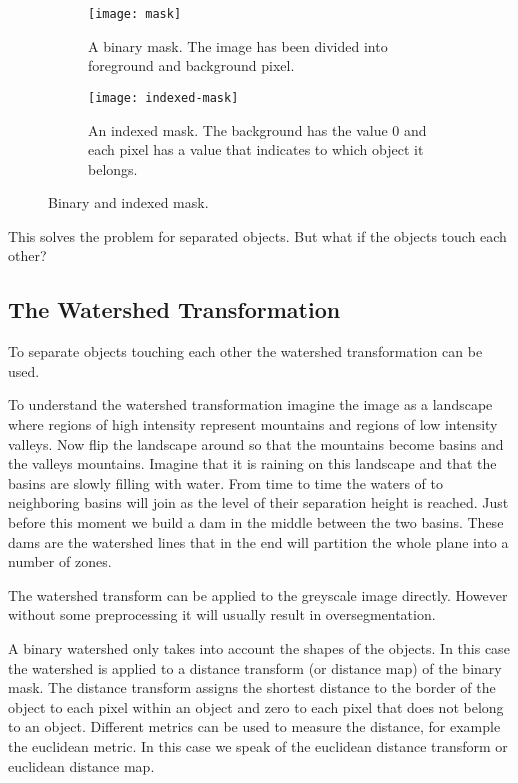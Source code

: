 \begin{figure}[h!]
  \centering
\begin{subfigure}[t]{0.30\textwidth}
\texttt{[image: mask]}
    \caption[binary mask]{A binary mask. The image has been divided into foreground and background pixel.}
    \label{binary-mask}
\end{subfigure}  
\begin{subfigure}[t]{0.30\textwidth}
\texttt{[image: indexed-mask]}
    \caption[indexed mask]{An indexed mask. The background has the value 0 and each pixel has a value that indicates to which object it belongs.}
    \label{indexed-mask}
\end{subfigure}
   \caption{Binary and indexed mask.}
   \label{binary-and-indexed-mask}
\end{figure}

This solves the problem for separated objects. But what if the objects touch each other? 

\subsection{The Watershed Transformation}

To separate objects touching each other the watershed transformation\cite{beucher_morphological_1992} can be used.

To understand the watershed transformation imagine the image as a landscape where regions of high intensity represent mountains and regions of low intensity valleys. Now flip the landscape around so that the mountains become basins and the valleys mountains. Imagine that it is raining on this landscape and that the basins are slowly filling with water. From time to time the waters of to neighboring basins will join as the level of their separation height is reached. Just before this moment we build a dam in the middle between the two basins. These dams are the watershed lines that in the end will partition the whole plane into a number of zones.

The watershed transform can be applied to the greyscale image directly. However without some preprocessing it will usually result in oversegmentation. 

A binary watershed only takes into account the shapes of the objects. In this case the watershed is applied to a distance transform (or distance map) of the binary mask. The distance transform assigns the shortest distance to the border of the object to each pixel within an object and zero to each pixel that does not belong to an object. Different metrics can be used to measure the distance, for example the euclidean metric. In this case we speak of the euclidean distance transform or euclidean distance map.

